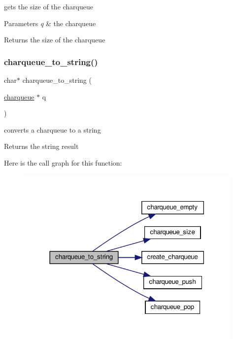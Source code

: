 gets the size of the charqueue 


\begin{DoxyParams}{Parameters}
{\em q} & the charqueue \\
\hline
\end{DoxyParams}
\begin{DoxyReturn}{Returns}
the size of the charqueue 
\end{DoxyReturn}
\mbox{\label{group__Queue_ga27406c20bfc03f7594e296a9ff320c0a}} 
\subsubsection{\texorpdfstring{charqueue\+\_\+to\+\_\+string()}{charqueue\_to\_string()}}
{\footnotesize\ttfamily char$\ast$ charqueue\+\_\+to\+\_\+string (\begin{DoxyParamCaption}\item[{\hyperlink{structcharqueue}{charqueue} $\ast$}]{q }\end{DoxyParamCaption})}



converts a charqueue to a string 

\begin{DoxyReturn}{Returns}
the string result 
\end{DoxyReturn}
Here is the call graph for this function\+:\nopagebreak
\begin{figure}[H]
\begin{center}
\leavevmode
\includegraphics[width=314pt]{group__Queue_ga27406c20bfc03f7594e296a9ff320c0a_cgraph}
\end{center}
\end{figure}
\mbox{\label{group__Queue_ga44a11e67ef5807557628f7c6a0767289}} 
